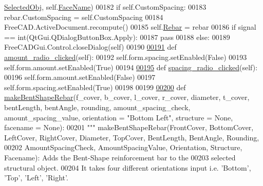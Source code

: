 \begin{DoxyCode}
      \hyperlink{classBentShapeRebar_1_1__BentShapeRebarTaskPanel_a24d363ab6c058ce4436a2b29e9c0b279}{SelectedObj}, self.\hyperlink{classBentShapeRebar_1_1__BentShapeRebarTaskPanel_a499514a87885d4c9462e3c6dc314ec9c}{FaceName})
00182         \textcolor{keywordflow}{if} self.CustomSpacing:
00183             rebar.CustomSpacing = self.CustomSpacing
00184             FreeCAD.ActiveDocument.recompute()
00185         self.\hyperlink{classBentShapeRebar_1_1__BentShapeRebarTaskPanel_aae8fd4e66d675c566d0afcee0af2341f}{Rebar} = rebar
00186         \textcolor{keywordflow}{if} signal == int(QtGui.QDialogButtonBox.Apply):
00187             \textcolor{keywordflow}{pass}
00188         \textcolor{keywordflow}{else}:
00189             FreeCADGui.Control.closeDialog(self)
00190 
\hypertarget{BentShapeRebar_8py_source.tex_l00191}{}\hyperlink{classBentShapeRebar_1_1__BentShapeRebarTaskPanel_ad99f80f17842220db5920e1926ff45a2}{00191}     \textcolor{keyword}{def }\hyperlink{classBentShapeRebar_1_1__BentShapeRebarTaskPanel_ad99f80f17842220db5920e1926ff45a2}{amount\_radio\_clicked}(self):
00192         self.form.spacing.setEnabled(\textcolor{keyword}{False})
00193         self.form.amount.setEnabled(\textcolor{keyword}{True})
00194 
\hypertarget{BentShapeRebar_8py_source.tex_l00195}{}\hyperlink{classBentShapeRebar_1_1__BentShapeRebarTaskPanel_a7fb1b14fac066c36380036c6d3f3ab4a}{00195}     \textcolor{keyword}{def }\hyperlink{classBentShapeRebar_1_1__BentShapeRebarTaskPanel_a7fb1b14fac066c36380036c6d3f3ab4a}{spacing\_radio\_clicked}(self):
00196         self.form.amount.setEnabled(\textcolor{keyword}{False})
00197         self.form.spacing.setEnabled(\textcolor{keyword}{True})
00198 
00199 
\hypertarget{BentShapeRebar_8py_source.tex_l00200}{}\hyperlink{namespaceBentShapeRebar_aac46779d3e1905db5a3788917f6e2476}{00200} \textcolor{keyword}{def }\hyperlink{namespaceBentShapeRebar_aac46779d3e1905db5a3788917f6e2476}{makeBentShapeRebar}(f\_cover, b\_cover, l\_cover, r\_cover, diameter, t\_cover, bentLength,
       bentAngle, rounding, amount\_spacing\_check, amount\_spacing\_value, orientation = "Bottom Left", structure = 
      None, facename = None):
00201     \textcolor{stringliteral}{""" makeBentShapeRebar(FrontCover, BottomCover, LeftCover, RightCover, Diameter, TopCover, BentLength,
       BentAngle, Rounding,}
00202 \textcolor{stringliteral}{    AmountSpacingCheck, AmountSpacingValue, Orientation, Structure, Facename): Adds the Bent-Shape
       reinforcement bar to the}
00203 \textcolor{stringliteral}{    selected structural object.}
00204 \textcolor{stringliteral}{    It takes four different orientations input i.e. 'Bottom', 'Top', 'Left', 'Right'.}

\end{DoxyCode}
